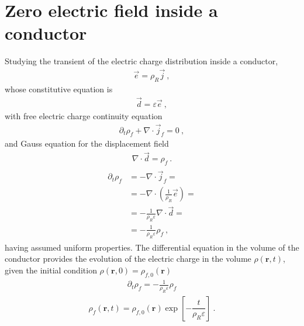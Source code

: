 \documentclass[letterpaper,10pt,italian]{jupyterBook}
\begin{document}
\section{Zero electric field inside a conductor}
\label{\detokenize{ch/electrostatics:zero-electric-field-inside-a-conductor}}
\sphinxAtStartPar
Studying the transient of the electric charge distribution inside a conductor,
\begin{equation*}
\begin{split}\vec{e} = \rho_R \vec{j} \ ,\end{split}
\end{equation*}
\sphinxAtStartPar
whose constitutive equation is
\begin{equation*}
\begin{split}\vec{d} = \varepsilon \vec{e} \ ,\end{split}
\end{equation*}
\sphinxAtStartPar
with free electric charge continuity equation
\begin{equation*}
\begin{split}\partial_t \rho_f + \nabla \cdot \vec{j}_f = 0 \ ,\end{split}
\end{equation*}
\sphinxAtStartPar
and Gauss equation for the displacement field
\begin{equation*}
\begin{split}\nabla \cdot \vec{d} = \rho_f \ .\end{split}
\end{equation*}\begin{equation*}
\begin{split}\begin{aligned}
  \partial_t \rho_f
  & = - \nabla \cdot \vec{j}_f = \\
  & = - \nabla \cdot \left( \frac{1}{\rho_R} \vec{e} \right) = \\
  & = - \frac{1}{\rho_R \varepsilon} \nabla \cdot \vec{d} = \\
  & = - \frac{1}{\rho_R \varepsilon} \rho_f \ ,
\end{aligned}\end{split}
\end{equation*}
\sphinxAtStartPar
having assumed uniform properties. The differential equation in the volume of the conductor provides the evolution of the electric charge in the volume \(\rho(\mathbf{r},t)\), given the initial condition \(\rho(\mathbf{r},0) = \rho_{f,0}(\mathbf{r})\)
\begin{equation*}
\begin{split}\partial_t \rho_f = - \frac{1}{\rho_R \varepsilon} \rho_f\end{split}
\end{equation*}\begin{equation*}
\begin{split}\rho_f(\mathbf{r},t) = \rho_{f,0}(\mathbf{r}) \exp\left[ - \dfrac{t}{\rho_R \varepsilon} \right] \ .\end{split}
\end{equation*}
\end{document}

